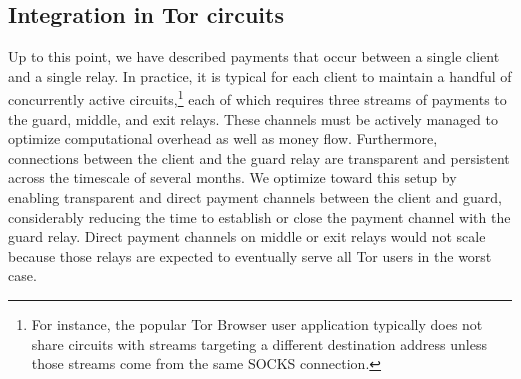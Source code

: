 \subsection{Integration in Tor circuits}
Up to this point, we have described payments that occur between a single client
and a single relay. In practice, it is typical for each client to maintain a
handful of concurrently active circuits,\footnote{For instance, the popular Tor
  Browser user application typically does not share circuits with streams
  targeting a different destination address unless those streams come from the
  same SOCKS connection.} each of which requires three streams of payments to
the guard, middle, and exit relays. These channels must be actively managed to
optimize computational overhead as well as money flow. Furthermore, connections
between the client and the guard relay are transparent and persistent across the
timescale of several months. We optimize toward this setup by enabling
transparent and direct payment channels between the client and guard,
considerably reducing the time to establish or close the payment channel with
the guard relay. Direct payment channels on middle or exit relays would not
scale because those relays are expected to eventually serve all Tor users in the
worst case.



%




